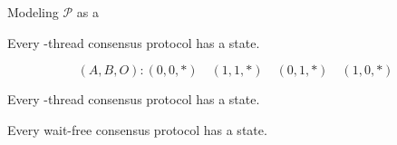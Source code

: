 
\begin{frame}{}
  \begin{center}
    Modeling $\mathcal{P}$ as a  \\[2pt]
  \end{center}
  
  \begin{center}
    
  \end{center}
\end{frame}

\begin{frame}{}
  \begin{theorem}
    Every -thread  consensus protocol has a  state.
  \end{theorem}

  \pause
  \[
    (A, B, O): (0,0,\ast) \quad (1,1,\ast) \quad (0,1,\ast) \quad (1,0,\ast)
  \]

  \pause
\end{frame}

\begin{frame}{}
  \begin{theorem}
    Every -thread consensus protocol has a  state.
  \end{theorem}

  \pause
  \vspace{0.30cm}
  \begin{theorem}
    Every wait-free consensus protocol has a  state.
  \end{theorem}

  \pause
  \begin{center}
    {\large {}}
    
  \end{center}
\end{frame}
